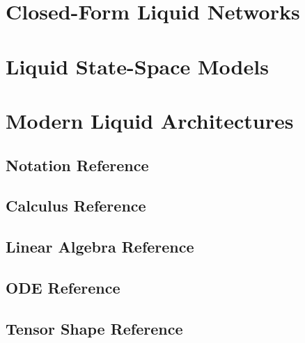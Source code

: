 \documentclass[12pt,letterpaper,oneside,openany]{book}
\begin{document}





\part{Closed-Form Liquid Networks}




\part{Liquid State-Space Models}





\part{Modern Liquid Architectures}







\backmatter

\appendix
\chapter{Notation Reference}
\label{app:notation}


\chapter{Calculus Reference}
\label{app:calculus}


\chapter{Linear Algebra Reference}
\label{app:linear_algebra}


\chapter{ODE Reference}
\label{app:ode}


\chapter{Tensor Shape Reference}
\label{app:tensor_shapes}


\printbibliography[heading=bibintoc,title={References}]
\end{document}

